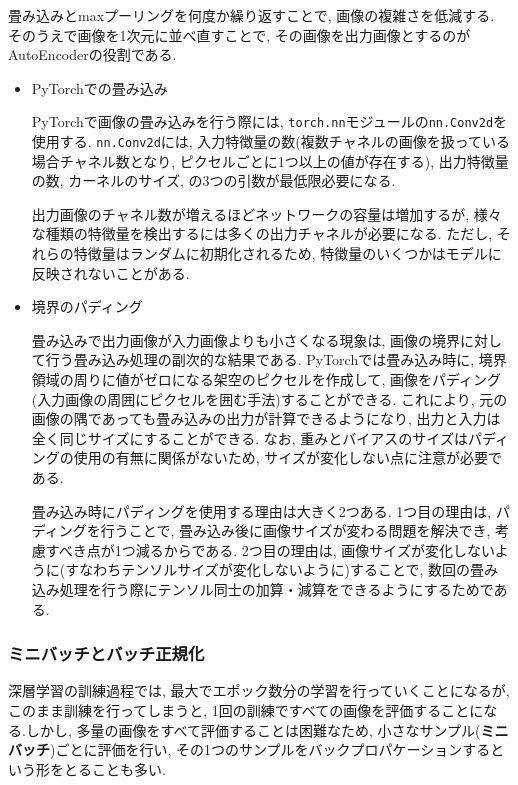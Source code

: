 \documentclass[dvipdfmx]{jsarticle}
\begin{document}
畳み込みとmaxプーリングを何度か繰り返すことで, 画像の複雑さを低減する.
そのうえで画像を1次元に並べ直すことで, その画像を出力画像とするのがAutoEncoderの役割である.

\begin{itemize}
    \item PyTorchでの畳み込み

    PyTorchで画像の畳み込みを行う際には,  \verb+torch.nn+モジュールの\verb+nn.Conv2d+を使用する.
    \verb+nn.Conv2d+には, 入力特徴量の数(複数チャネルの画像を扱っている場合チャネル数となり, ピクセルごとに1つ以上の値が存在する), 出力特徴量の数, カーネルのサイズ, の3つの引数が最低限必要になる.
    
    出力画像のチャネル数が増えるほどネットワークの容量は増加するが, 様々な種類の特徴量を検出するには多くの出力チャネルが必要になる.
    ただし, それらの特徴量はランダムに初期化されるため, 特徴量のいくつかはモデルに反映されないことがある.

    \item 境界のパディング

    畳み込みで出力画像が入力画像よりも小さくなる現象は, 画像の境界に対して行う畳み込み処理の副次的な結果である.
    PyTorchでは畳み込み時に, 境界領域の周りに値がゼロになる架空のピクセルを作成して, 画像をパディング(入力画像の周囲にピクセルを囲む手法)することができる.
    これにより, 元の画像の隅であっても畳み込みの出力が計算できるようになり, 出力と入力は全く同じサイズにすることができる.
    なお, 重みとバイアスのサイズはパディングの使用の有無に関係がないため, サイズが変化しない点に注意が必要である.
    
    畳み込み時にパディングを使用する理由は大きく2つある.
    1つ目の理由は, パディングを行うことで, 畳み込み後に画像サイズが変わる問題を解決でき, 考慮すべき点が1つ減るからである.
    2つ目の理由は, 画像サイズが変化しないように(すなわちテンソルサイズが変化しないように)することで, 数回の畳み込み処理を行う際にテンソル同士の加算・減算をできるようにするためである.

    
    
\end{itemize}

\subsubsection{ミニバッチとバッチ正規化}
深層学習の訓練過程では, 最大でエポック数分の学習を行っていくことになるが, このまま訓練を行ってしまうと, 1回の訓練ですべての画像を評価することになる.しかし, 多量の画像をすべて評価することは困難なため, 小さなサンプル(\textbf{ミニバッチ})ごとに評価を行い, その1つのサンプルをバックプロパケーションするという形をとることも多い.
\end{document}
